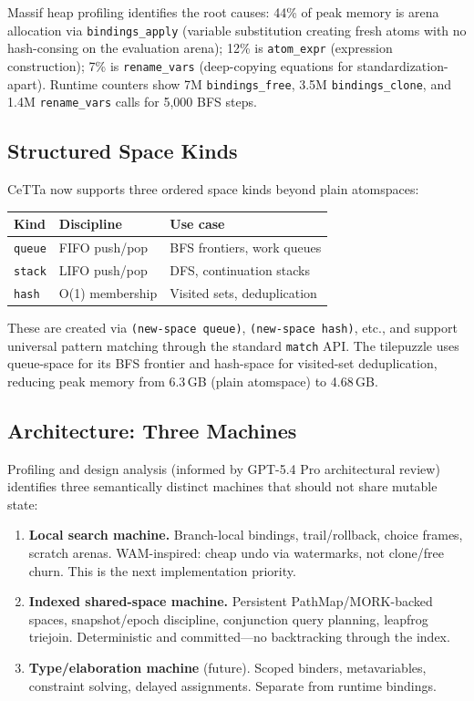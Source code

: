 \documentclass[11pt]{article}
\newcommand{\code}[1]{\texttt{#1}}
\newcommand{\CeTTa}{\textup{CeTTa}}
\begin{document}
Massif heap profiling identifies the root causes:
44\% of peak memory is arena allocation via \code{bindings\_apply}
(variable substitution creating fresh atoms with no hash-consing on
the evaluation arena); 12\% is \code{atom\_expr} (expression
construction); 7\% is \code{rename\_vars} (deep-copying equations
for standardization-apart).  Runtime counters show 7M
\code{bindings\_free}, 3.5M \code{bindings\_clone}, and 1.4M
\code{rename\_vars} calls for 5{,}000 BFS steps.

\subsection{Structured Space Kinds}

\CeTTa{} now supports three ordered space kinds beyond plain atomspaces:

\begin{center}
\begin{tabular}{lll}
\toprule
Kind & Discipline & Use case \\
\midrule
\code{queue} & FIFO push/pop & BFS frontiers, work queues \\
\code{stack} & LIFO push/pop & DFS, continuation stacks \\
\code{hash} & O(1) membership & Visited sets, deduplication \\
\bottomrule
\end{tabular}
\end{center}

These are created via \code{(new-space queue)}, \code{(new-space hash)},
etc., and support universal pattern matching through the standard
\code{match} API\@.  The tilepuzzle uses queue-space for its BFS
frontier and hash-space for visited-set deduplication, reducing
peak memory from 6.3\,GB (plain atomspace) to 4.68\,GB.

\subsection{Architecture: Three Machines}

Profiling and design analysis (informed by GPT-5.4 Pro architectural
review) identifies three semantically distinct machines that should
not share mutable state:

\begin{enumerate}
\item \textbf{Local search machine.}
  Branch-local bindings, trail/rollback, choice frames, scratch arenas.
  WAM-inspired: cheap undo via watermarks, not clone/free churn.
  This is the next implementation priority.

\item \textbf{Indexed shared-space machine.}
  Persistent PathMap/MORK-backed spaces, snapshot/epoch discipline,
  conjunction query planning, leapfrog triejoin.
  Deterministic and committed---no backtracking through the index.

\item \textbf{Type/elaboration machine} (future).
  Scoped binders, metavariables, constraint solving, delayed
  assignments.  Separate from runtime bindings.
\end{enumerate}
\end{document}
